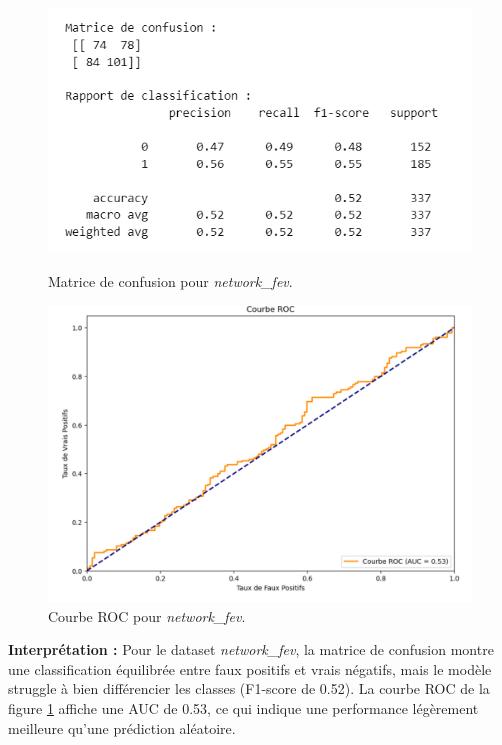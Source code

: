 \begin{figure}[H]
    \centering
    \begin{minipage}{0.45\linewidth}
        \centering
        \includegraphics[width=\linewidth]{capture_modele_1.png}
        \caption{Matrice de confusion pour \textit{network\_fev}.}
        \label{eee}
    \end{minipage}
    \hfill
    \begin{minipage}{0.45\linewidth}
        \centering
        \includegraphics[width=\linewidth]{capture_modele_3.png}
        \caption{Courbe ROC pour \textit{network\_fev}.}
        \label{hhh}
    \end{minipage}
\end{figure}

\textbf{Interprétation :} Pour le dataset \textit{network\_fev}, la matrice de confusion montre une classification équilibrée entre faux positifs et vrais négatifs, mais le modèle struggle à bien différencier les classes (F1-score de 0.52). La courbe ROC de la figure \ref{hhh} affiche une AUC de 0.53, ce qui indique une performance légèrement meilleure qu'une prédiction aléatoire.

